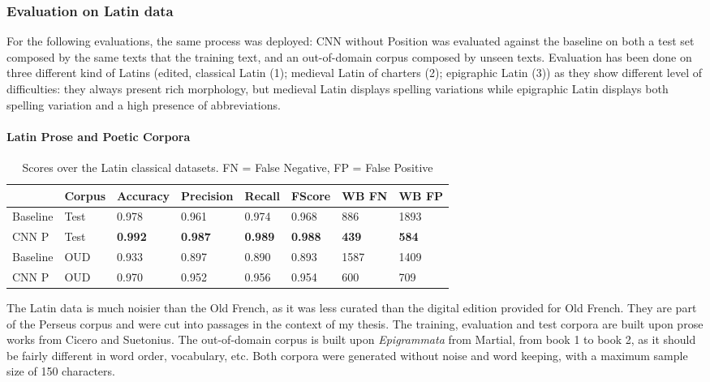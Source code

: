 \documentclass{jdmdh}
\begin{document}
\subsubsection{Evaluation on Latin data}

For the following evaluations, the same process was deployed: CNN without Position was evaluated against the baseline on both a test set composed by the same texts that the training text, and an out-of-domain corpus composed by unseen texts. Evaluation has been done on three different kind of Latins (edited, classical Latin (1); medieval Latin of charters (2); epigraphic Latin (3)) as they show different level of difficulties: they always present rich morphology, but medieval Latin displays spelling variations while epigraphic Latin displays both spelling variation and a high presence of abbreviations.

\paragraph{Latin Prose and Poetic Corpora}

\begin{table}[H]
\centering
\begin{tabular}{llllllll}
\hline
 & Corpus & Accuracy & Precision & Recall & FScore & WB FN & WB FP \\ \hline
Baseline & Test & 0.978 & 0.961 & 0.974 & 0.968 & 886 & 1893 \\
CNN P & Test & \textbf{0.992} & \textbf{0.987} & \textbf{0.989} & \textbf{0.988} & \textbf{439} & \textbf{584} \\ \hline
Baseline & OUD & 0.933 & 0.897 & 0.890 & 0.893 & 1587 & 1409 \\
CNN P & OUD & 0.970 & 0.952 & 0.956 & 0.954 & 600 & 709 \\ \hline
\end{tabular}
\caption{Scores over the Latin classical datasets. FN = False Negative, FP = False Positive}
\label{tab:latin_corpora}
\end{table}

The Latin data is much noisier than the Old French, as it was less curated than the digital edition provided for Old French. They are part of the Perseus corpus \citet{perseus} and were cut into passages in the context of my thesis. The training, evaluation and test corpora are built upon prose works from Cicero and Suetonius. The out-of-domain corpus is built upon \textit{Epigrammata} from Martial, from book 1 to book 2, as it should be fairly different in word order, vocabulary, etc. Both corpora were generated without noise and word keeping, with a maximum sample size of 150 characters.
\end{document}
